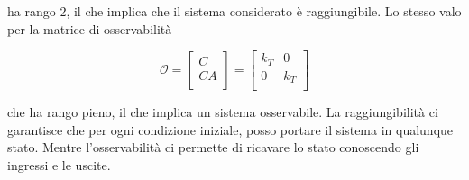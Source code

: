 	\noindent ha rango 2, il che implica che il sistema considerato è raggiungibile. Lo stesso valo per la matrice di osservabilità
		
	\begin{equation}
		\mathcal{O}=
		\left[
		\begin{array}{cc}
			C  \\ \hline
			CA \\
		\end{array}
		\right]
		=
		\begin{bmatrix}
			k_T & 0   \\
			0   & k_T \\
		\end{bmatrix}
	\end{equation} 
		
	\noindent che ha rango pieno, il  che implica un sistema osservabile. La raggiungibilità ci garantisce che per ogni condizione iniziale, posso portare il sistema in qualunque stato. Mentre l'osservabilità ci permette di ricavare lo stato conoscendo gli ingressi e le uscite.